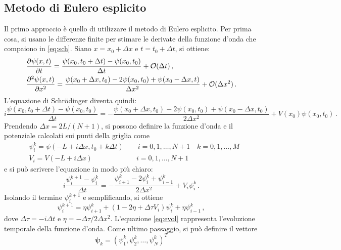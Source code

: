 \documentclass[a4paper, titlepage]{article}
\begin{document}
\subsection{Metodo di Eulero esplicito}
Il primo approccio è quello di utilizzare il metodo di Eulero esplicito. 
Per prima cosa, si usano le differenze finite per stimare le derivate della funzione d'onda che compaiono in \eqref{eq:sch}. Siano $x = x_0 + \Delta x$ e $t = t_0 + \Delta t$, si ottiene:
\begin{align*}
    &\pdv{\psi(x, t)}{t} = \frac{\psi(x_0, t_0 + \Delta t) - \psi(x_0, t_0)}{\Delta t} + \mathcal{O}(\Delta t)\, , \\
    &\pdv[2]{\psi(x, t)}{x} = \frac{\psi(x_0 + \Delta x, t_0) - 2\psi(x_0, t_0) + \psi(x_0 - \Delta x, t)}{\Delta x^2} + \mathcal{O}(\Delta x^2)\, .
\end{align*}
L'equazione di Schrödinger diventa quindi:
\begin{equation*}
    i \frac{\psi(x_0, t_0 + \Delta t) - \psi(x_0, t_0)}{\Delta t} = 
    - \frac{\psi(x_0 + \Delta x, t_0) - 2\psi(x_0, t_0) + \psi(x_0 - \Delta x, t_0)}{2\Delta x^2} + V(x_0)\psi(x_0, t_0)\, .
\end{equation*}
Prendendo $\Delta x = 2L/(N+1)$, si possono definire la funzione d'onda e il potenziale calcolati sui punti della griglia come
\begin{align*}
    &\psi_i^k = \psi(-L + i\Delta x, t_0 + k\Delta t) \qquad i = 0,1,\dots,N+1 \quad k = 0,1,\dots,M \\
    &V_i = V(-L + i\Delta x) \qquad\qquad\qquad\ i = 0,1,\dots,N+1
\end{align*}
e si può scrivere l'equazione in modo più chiaro:
\begin{equation*}
    i \frac{\psi_i^{k+1} - \psi_i^k}{\Delta t} = 
    - \frac{\psi_{i+1}^k - 2\psi_i^k + \psi_{i-1}^k}{2\Delta x^2} + V_i\psi_i^k\, .
\end{equation*}
Isolando il termine $\psi_i^{k+1}$ e semplificando, si ottiene
\begin{equation}
    \psi_i^{k+1} = \eta \psi_{i+1}^k + (1 - 2\eta + \Delta\tau V_i)\psi_i^k + \eta\psi_{i-1}^k\, ,
    \label{eq:evol}
\end{equation}
dove $\Delta\tau = -i\Delta t$ e $\eta = - \Delta\tau/2\Delta x^2$. L'equazione \eqref{eq:evol} rappresenta l'evoluzione temporale della funzione d'onda. Come ultimo passaggio, si può definire il vettore
\begin{equation*}
    \bm{\psi}_k = (\psi_1^k,\psi_2^k,\dots,\psi_N^k)^T
\end{equation*}
\end{document}
